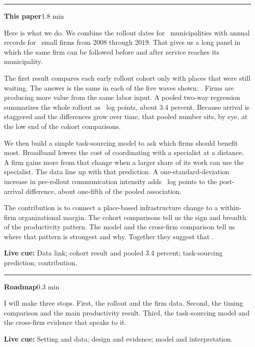 \documentclass[11pt]{article}
\newcommand{\Cue}[1]{\par\nobreak\smallskip\noindent\textcolor{ScriptGray}{\footnotesize
  \textbf{Live cue:} #1}\par}
\newcommand{\scriptframe}[3]{%
  \Needspace{11\baselineskip}%
  \par\medskip\noindent\textcolor{ScriptBlue}{\rule{\linewidth}{0.55pt}}%
  \par\smallskip\noindent
  \textbf{#1}\hfill\textcolor{ScriptGray}{\small #2}\par\smallskip
  #3\par}
\begin{document}
\scriptframe{This paper}{1.8 min}{%
  Here is what we do. We combine the rollout dates for
  \ResMunicipalities\ municipalities with annual records for \ResFirms\ small
  firms from 2008 through 2019. That gives us a long panel in which the same
  firm can be followed before and after service reaches its municipality.

  The first result compares each early rollout cohort only with places that
  were still waiting. The answer is the same in each of the five waves shown:
  \ResultHeadlineSpoken.
  Firms are producing more value
  from the same labor input. A pooled two-way regression summarizes the whole
  rollout as \ResBaseline\ log points, about 3.4 percent. Because arrival is
  staggered and the differences grow over time, that pooled number sits, by
  eye, at the low end of the cohort comparisons.

  We then build a simple task-sourcing model to ask which firms should benefit
  most. Broadband lowers the cost of coordinating with a specialist at a
  distance. A firm gains more from that change when a larger share of its work
  can use the specialist. The data line up with that prediction. A
  one-standard-deviation increase in pre-rollout communication intensity adds
  \ResCommSDGap\ log points to the post-arrival difference, about one-fifth of
  the pooled association.

  The contribution is to connect a place-based infrastructure change to a
  within-firm organizational margin. The cohort comparisons tell us the sign and
  breadth of the productivity pattern. The model and the cross-firm comparison tell us
  where that pattern is strongest and why. Together they suggest that
  \ResultImplicationSpoken.
  \Cue{Data link; cohort result and pooled 3.4 percent; task-sourcing prediction; contribution.}
}

\scriptframe{Roadmap}{0.3 min}{%
  I will make three stops. First, the rollout and the firm data. Second, the
  timing comparison and the main productivity result. Third, the task-sourcing
  model and the cross-firm evidence that speaks to it.
  \Cue{Setting and data; design and evidence; model and interpretation.}
}
\end{document}
